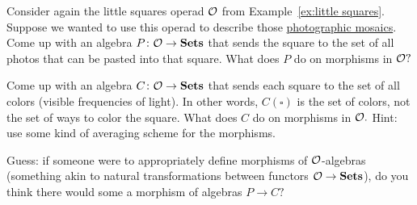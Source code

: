 \documentclass[../main/CT4S-EN-RU]{subfiles}
\begin{document}
\begin{applicationRUS}
\end{applicationRUS}

\begin{exerciseENG}
Consider again the little squares operad $\mathcal{O}$ from Example~\ref{ex:little squares}. Suppose we wanted to use this operad to describe those \href{http://en.wikipedia.org/wiki/Photographic_mosaic}{\text photographic mosaics}. 
\sexc Come up with an algebra $P\colon\mathcal{O}\rightarrow{\mathbf{Sets}}$ that sends the square to the set of all photos that can be pasted into that square. What does $P$ do on morphisms in $\mathcal{O}?$
\item Come up with an algebra $C\colon\mathcal{O}\rightarrow{\mathbf{Sets}}$ that sends each square to the set of all colors (visible frequencies of light). In other words, $C(\square)$ is the set of colors, not the set of ways to color the square. What does $C$ do on morphisms in $\mathcal{O}.$ Hint: use some kind of averaging scheme for the morphisms.
\item Guess: if someone were to appropriately define morphisms of $\mathcal{O}$-algebras (something akin to natural transformations between functors $\mathcal{O}\rightarrow{\mathbf{Sets}}$), do you think there would some a morphism of algebras $P\to C?$
\endsexc
\end{exerciseENG}

\begin{exerciseRUS}
\end{exerciseRUS}


\subsubsection{}
\end{document}
